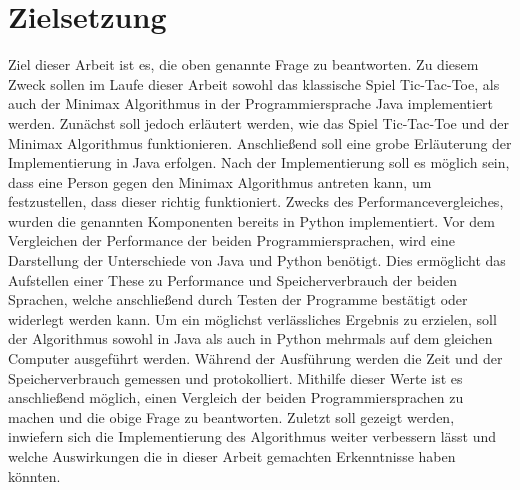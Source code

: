 \section{Zielsetzung}
Ziel dieser Arbeit ist es, die oben genannte Frage zu beantworten. Zu diesem Zweck sollen im Laufe dieser Arbeit sowohl das klassische Spiel Tic-Tac-Toe,
als auch der Minimax Algorithmus in der Programmiersprache Java implementiert werden. Zunächst soll jedoch erläutert werden, wie das
Spiel Tic-Tac-Toe und der Minimax Algorithmus funktionieren. Anschließend soll eine grobe Erläuterung der Implementierung in Java erfolgen.
Nach der Implementierung soll es möglich sein, dass eine Person gegen den Minimax Algorithmus antreten kann, um festzustellen, dass dieser richtig
funktioniert. Zwecks des Performancevergleiches, wurden die genannten Komponenten bereits in Python implementiert. Vor dem Vergleichen der Performance
der beiden Programmiersprachen, wird eine Darstellung der Unterschiede von Java und Python benötigt. Dies ermöglicht das Aufstellen einer These zu
Performance und Speicherverbrauch der beiden Sprachen, welche anschließend durch Testen der Programme bestätigt oder widerlegt werden kann. Um ein 
möglichst verlässliches Ergebnis zu erzielen, soll der Algorithmus sowohl in Java als auch in Python mehrmals auf dem gleichen Computer ausgeführt werden. 
Während der Ausführung werden die Zeit und der Speicherverbrauch gemessen und protokolliert. Mithilfe dieser Werte ist es anschließend möglich, einen 
Vergleich der beiden Programmiersprachen zu machen und die obige Frage zu beantworten. Zuletzt soll gezeigt werden, inwiefern sich die Implementierung des
Algorithmus weiter verbessern lässt und welche Auswirkungen die in dieser Arbeit gemachten Erkenntnisse haben könnten.